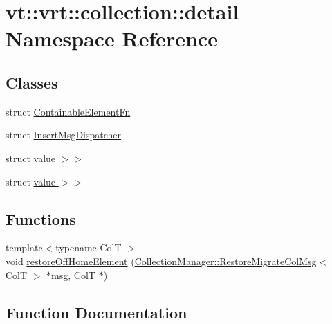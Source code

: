\hypertarget{namespacevt_1_1vrt_1_1collection_1_1detail}{}\section{vt\+:\+:vrt\+:\+:collection\+:\+:detail Namespace Reference}
\label{namespacevt_1_1vrt_1_1collection_1_1detail}
\subsection*{Classes}
\begin{DoxyCompactItemize}
\item 
struct \hyperlink{structvt_1_1vrt_1_1collection_1_1detail_1_1_containable_element_fn}{Containable\+Element\+Fn}
\item 
struct \hyperlink{structvt_1_1vrt_1_1collection_1_1detail_1_1_insert_msg_dispatcher}{Insert\+Msg\+Dispatcher}
\item 
struct \hyperlink{structvt_1_1vrt_1_1collection_1_1detail_1_1_insert_msg_dispatcher_3_01_msg_t_00_01_col_t_00_01st21bfbb9f37f35dd344d97132b3f17280}{value $>$$>$}
\item 
struct \hyperlink{structvt_1_1vrt_1_1collection_1_1detail_1_1_insert_msg_dispatcher_3_01_msg_t_00_01_col_t_00_01st63328b77cb25348343d0eb4c4a2955e0}{value $>$$>$}
\end{DoxyCompactItemize}
\subsection*{Functions}
\begin{DoxyCompactItemize}
\item 
{\footnotesize template$<$typename ColT $>$ }\\void \hyperlink{namespacevt_1_1vrt_1_1collection_1_1detail_a2a387e68b1392802fedbec74969cd988}{restore\+Off\+Home\+Element} (\hyperlink{structvt_1_1vrt_1_1collection_1_1_collection_manager_1_1_restore_migrate_col_msg}{Collection\+Manager\+::\+Restore\+Migrate\+Col\+Msg}$<$ ColT $>$ $\ast$msg, ColT $\ast$)
\end{DoxyCompactItemize}


\subsection{Function Documentation}
\mbox{\label{namespacevt_1_1vrt_1_1collection_1_1detail_a2a387e68b1392802fedbec74969cd988}} 

